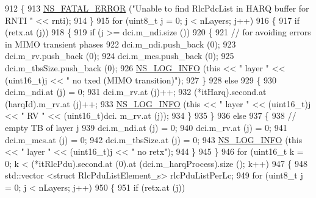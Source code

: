 \begin{DoxyCode}
912             \{
913               \hyperlink{group__fatal_ga5131d5e3f75d7d4cbfd706ac456fdc85}{NS\_FATAL\_ERROR} (\textcolor{stringliteral}{"Unable to find RlcPdcList in HARQ buffer for RNTI "} << rnti);
914             \}
915           \textcolor{keywordflow}{for} (uint8\_t j = 0; j < nLayers; j++)
916             \{
917               \textcolor{keywordflow}{if} (retx.at (j))
918                 \{
919                   \textcolor{keywordflow}{if} (j >= dci.m\_ndi.size ())
920                     \{
921                       \textcolor{comment}{// for avoiding errors in MIMO transient phases}
922                       dci.m\_ndi.push\_back (0);
923                       dci.m\_rv.push\_back (0);
924                       dci.m\_mcs.push\_back (0);
925                       dci.m\_tbsSize.push\_back (0);
926                       \hyperlink{group__logging_gafbd73ee2cf9f26b319f49086d8e860fb}{NS\_LOG\_INFO} (\textcolor{keyword}{this} << \textcolor{stringliteral}{" layer "} << (uint16\_t)j << \textcolor{stringliteral}{" no txed (MIMO
       transition)"});
927                     \}
928                   \textcolor{keywordflow}{else}
929                     \{
930                       dci.m\_ndi.at (j) = 0;
931                       dci.m\_rv.at (j)++;
932                       (*itHarq).second.at (harqId).m\_rv.at (j)++;
933                       \hyperlink{group__logging_gafbd73ee2cf9f26b319f49086d8e860fb}{NS\_LOG\_INFO} (\textcolor{keyword}{this} << \textcolor{stringliteral}{" layer "} << (uint16\_t)j << \textcolor{stringliteral}{" RV "} << (uint16\_t)dci.
      m\_rv.at (j));
934                     \}
935                 \}
936               \textcolor{keywordflow}{else}
937                 \{
938                   \textcolor{comment}{// empty TB of layer j}
939                   dci.m\_ndi.at (j) = 0;
940                   dci.m\_rv.at (j) = 0;
941                   dci.m\_mcs.at (j) = 0;
942                   dci.m\_tbsSize.at (j) = 0;
943                   \hyperlink{group__logging_gafbd73ee2cf9f26b319f49086d8e860fb}{NS\_LOG\_INFO} (\textcolor{keyword}{this} << \textcolor{stringliteral}{" layer "} << (uint16\_t)j << \textcolor{stringliteral}{" no retx"});
944                 \}
945             \}
946           \textcolor{keywordflow}{for} (uint16\_t k = 0; k < (*itRlcPdu).second.at (0).at (dci.m\_harqProcess).size (); k++)
947             \{
948               std::vector <struct RlcPduListElement\_s> rlcPduListPerLc;
949               \textcolor{keywordflow}{for} (uint8\_t j = 0; j < nLayers; j++)
950                 \{
951                   \textcolor{keywordflow}{if} (retx.at (j))

\end{DoxyCode}
